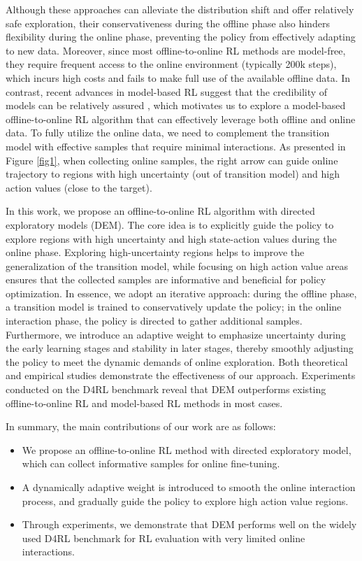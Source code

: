 \documentclass[conference]{IEEEtran}
\begin{document}
Although these approaches can alleviate the distribution shift and offer relatively safe exploration, their conservativeness during the offline phase also hinders flexibility during the online phase, preventing the policy from effectively adapting to new data. Moreover, since most offline-to-online RL methods are model-free, they require frequent access to the online environment (typically 200k steps), which incurs high costs and fails to make full use of the available offline data. In contrast, recent advances in model-based RL suggest that the credibility of models can be relatively assured \cite{mopo,rambo,combo,yang2023model,sun2024conformal}, which motivates us to explore a model-based offline-to-online RL algorithm that can effectively leverage both offline and online data. To fully utilize the online data, we need to complement the transition model with effective samples that require minimal interactions. As presented in Figure \ref{fig1}, when collecting online samples, the right arrow can guide online trajectory to regions with high uncertainty (out of transition model) and high action values (close to the target).

In this work, we propose an offline-to-online RL algorithm with directed exploratory models (DEM). The core idea is to explicitly guide the policy to explore regions with high uncertainty and high state-action values during the online phase. Exploring high-uncertainty regions helps to improve the generalization of the transition model, while focusing on high action value areas ensures that the collected samples are informative and beneficial for policy optimization. In essence, we adopt an iterative approach: during the offline phase, a transition model is trained to conservatively update the policy; in the online interaction phase, the policy is directed to gather additional samples. Furthermore, we introduce an adaptive weight to emphasize uncertainty during the early learning stages and stability in later stages, thereby smoothly adjusting the policy to meet the dynamic demands of online exploration. Both theoretical and empirical studies demonstrate the effectiveness of our approach. Experiments conducted on the D4RL benchmark \cite{d4rl} reveal that DEM outperforms existing offline-to-online RL and model-based RL methods in most cases.

In summary, the main contributions of our work are as follows:
\begin{itemize}
\item We propose an offline-to-online RL method with directed exploratory model, which can collect informative samples for online fine-tuning.
\item A dynamically adaptive weight is introduced to smooth the online interaction process, and gradually guide the policy to explore high action value regions.
\item Through experiments, we demonstrate that DEM performs well on the widely used D4RL benchmark for RL evaluation with very limited online interactions.
\end{itemize}
\end{document}
